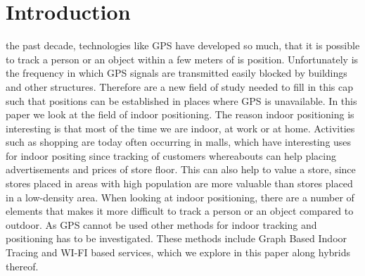 \section{Introduction}
 the past decade, technologies like GPS have developed so much, that it is possible to track a person or an object within a few meters of is position. 
Unfortunately is the frequency in which GPS signals are transmitted easily blocked by buildings and other structures. 
Therefore are a new field of study needed to fill in this cap such that positions can be established in places where GPS is unavailable.
In this paper we look at the field of indoor positioning. 
The reason indoor positioning is interesting is that most of the time we are indoor, at work or at home. 
Activities such as shopping are today often occurring in malls, which have interesting uses for indoor positing since tracking of customers whereabouts can help placing advertisements and prices of store floor. This can also help to value a store, since stores placed in areas with high population are more valuable than stores placed in a low-density area.
When looking at indoor positioning, there are a number of elements that makes it more difficult to track a person or an object compared to outdoor.
As GPS cannot be used other methods for indoor tracking and positioning has to be investigated. 
These methods include Graph Based Indoor Tracing and WI-FI based services, which we explore in this paper along hybrids thereof.  




